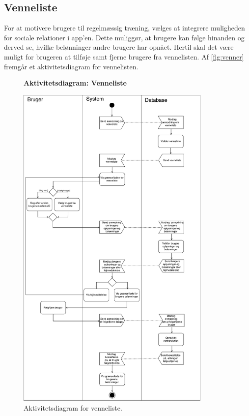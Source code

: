\subsection*{Venneliste} 
For at motivere brugere til regelmæssig træning, vælges at integrere muligheden for sociale relationer i app'en. Dette muliggør, at brugere kan følge hinanden og derved se, hvilke belønninger andre brugere har opnået. Hertil skal det være muligt for brugeren at tilføje samt fjerne brugere fra vennelisten. 
Af \autoref{fig:venner} fremgår et aktivitetsdiagram for vennelisten.

\begin{figure} [H]
\centering
\textbf{Aktivitetsdiagram: Venneliste}\par\medskip
\includegraphics[width=0.85\textwidth]{figures/aktivitetsdiagram/venner}
\caption{Aktivitetsdiagram for venneliste.}
\label{fig:venner}
\end{figure}

